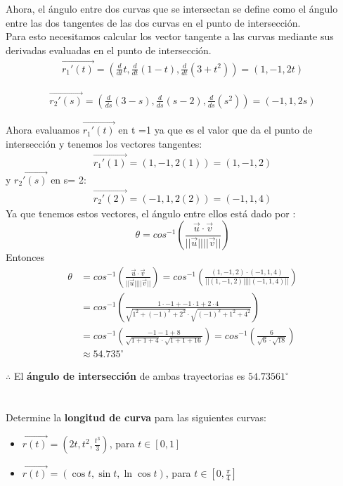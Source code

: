 \documentclass[12pt]{article}
\begin{document}
  Ahora, el ángulo entre dos curvas que se intersectan se define como el ángulo entre las dos tangentes de las dos curvas en el punto de intersección.\\
  Para esto necesitamos calcular los  vector tangente a las curvas mediante sus derivadas evaluadas en el punto de intersección.
\begin{align*}
    \vec{r_1'(t)} = \left( \frac{d}{dt} t, \frac{d}{dt}  (1-t), \frac{d}{dt} (3+t^2) \right) =  (1, -1, 2t)
\end{align*}

\begin{align*}
    \vec{r_2'(s)} = \left( \frac{d}{ds} (3-s),\frac{d}{ds} (s-2),\frac{d}{ds}(s^2)  \right) = (-1, 1, 2s) 
\end{align*}

Ahora evaluamos $\vec{r_1'(t)}$ en t =1 ya que es el valor que da el punto de intersección y tenemos los vectores tangentes:
\begin{align*}
    \vec{r_1'(1)} =  (1, -1, 2(1))  =(1, -1, 2)
\end{align*}
y  $\vec{r_2'(s)}$ en s= 2: 
\begin{align*}
  \vec{r_2'(2)} = (-1, 1, 2(2)) = (-1, 1, 4)
\end{align*}
Ya que tenemos estos vectores, el ángulo entre ellos está dado por :
\[
\theta = cos^{-1 }\left(\frac{\vec{u} \cdot \vec{v}}{||\vec{u}|| ||\vec{v}||}\right)
\]
Entonces
\begin{align*}
  \theta &= cos^{-1 }\left(\frac{\vec{u} \cdot \vec{v}}{||\vec{u}|| ||\vec{v}||}\right) = cos^{-1 }\left(\frac{(1, -1, 2) \cdot (-1, 1, 4)}{||(1, -1, 2)|| ||(-1, 1, 4)||}\right) \\
  &=  cos^{-1 }\left(  \frac{1 \cdot -1 + -1 \cdot 1 + 2 \cdot 4}{\sqrt{1^2 + (-1)^2 + 2^2} \cdot \sqrt{(-1)^2 + 1^2 + 4^2}} \right) \\
  &=  cos^{-1 }\left( \frac{-1  -1 + 8}{\sqrt{1 + 1 + 4} \cdot \sqrt{1 + 1 + 16}} \right)  =  cos^{-1 }\left( \frac{6}{\sqrt{6} \cdot \sqrt{18}}\right) \\
  &\approx 54.735 ^\circ 
\end{align*}

$\therefore$ El \textbf{ángulo de intersección} de ambas trayectorias es $54.73561 ^\circ$ 


\section{}
Determine la \textbf{longitud de curva} para las siguientes curvas:
\begin{itemize}[format=\textbf]

\item $\vec{r(t)}=\left(2t,t^2,\frac{t^3}{3}\right)$, para $t \in [0,1]$

\item $\vec{r(t)}=\left(\cos{t},\sin{t},\ln{\cos{t}}\right)$, para $t \in \left[0,\frac{\pi}{4}\right]$

\end{itemize}
\end{document}
